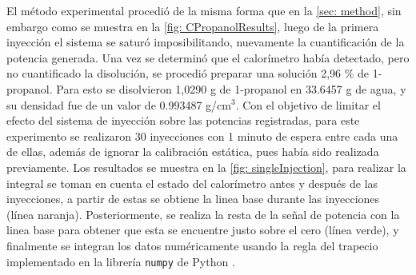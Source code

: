 	
	
	El m\'etodo experimental procedi\'o de la misma forma que en la \autoref{sec: method}, sin embargo como se muestra en la \autoref{fig: CPropanolResults}, luego de la primera inyecci\'on el sistema se satur\'o imposibilitando, nuevamente la cuantificaci\'on de la potencia generada. Una vez se determin\'o que el calor\'imetro hab\'ia detectado, pero no cuantificado la disoluci\'on, se procedi\'o preparar una soluci\'on 2,96 \% de 1-propanol. Para esto se disolvieron 1,0290 g de 1-propanol en 33.6457 g de agua, y su densidad fue de un valor de 0.993487 g/cm$^{3}$. Con el objetivo de limitar el efecto del sistema de inyecci\'on sobre las potencias registradas, para este experimento se realizaron 30 inyecciones con 1 minuto de espera entre cada una de ellas, adem\'as de ignorar la calibraci\'on est\'atica, pues hab\'ia sido realizada previamente. Los resultados se muestra en la \autoref{fig: singleInjection}, para realizar la integral se toman en cuenta el estado del calor\'imetro antes y despu\'es de las inyecciones, a partir de estas se obtiene la linea base durante las inyecciones (l\'inea naranja). Posteriormente, se realiza la resta de la se\~nal de potencia con la linea base para obtener que esta se encuentre justo sobre el cero (l\'inea verde), y finalmente se integran los datos num\'ericamente usando la regla del trapecio \cite{landau2008survey} implementado en la librer\'ia \texttt{numpy} de Python \cite{walt2011numpy}.
	
